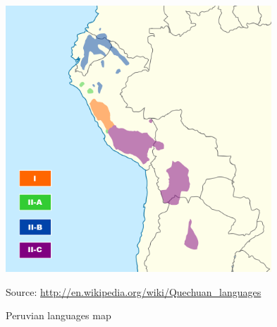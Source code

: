 \begin{figure}[!ht]
\begin{center}
\includegraphics[width=0.889\textwidth]{figures/yqgi03}
\end{center}
\caption{Peruvian languages map}\label{Figsim}
\raggedright
{\scriptsize Source: \url{http://en.wikipedia.org/wiki/Quechuan_languages}}
\end{figure}

